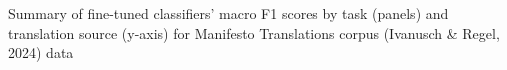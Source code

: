 Summary of fine-tuned classifiers' macro F1 scores by task (panels) and translation source (y-axis) for Manifesto Translations corpus (Ivanusch \& Regel, 2024) data \label{fig:f1_scores_cmp_translations_sample}
